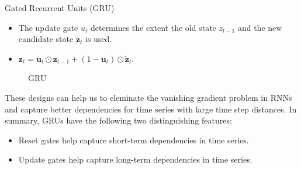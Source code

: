 \begin{vbframe}{Gated Recurrent Units (GRU)}
  \begin{itemize}
  \item The update gate $u_t$ determines the extent the old state $z_{t-1}$ and the new candidate state $\tilde{\mathbf{z}}_t$ is used. 
  \item $\mathbf{z}_t = \mathbf{u}_t \odot \mathbf{z}_{t-1}  + (1 - \mathbf{u}_t) \odot \tilde{\mathbf{z}}_t.$
  \end{itemize}
  \begin{figure}
      \centering
      \caption{\footnotesize{GRU}}
  \end{figure}
 
  These designs can help us to eleminate the vanishing gradient problem in RNNs and capture better dependencies for time series with large time step distances. In summary, GRUs have the following two distinguishing features:
  \begin{itemize}
    \item Reset gates help capture short-term dependencies in time series.
    \item Update gates help capture long-term dependencies in time series.
  \end{itemize}
\end{vbframe}

